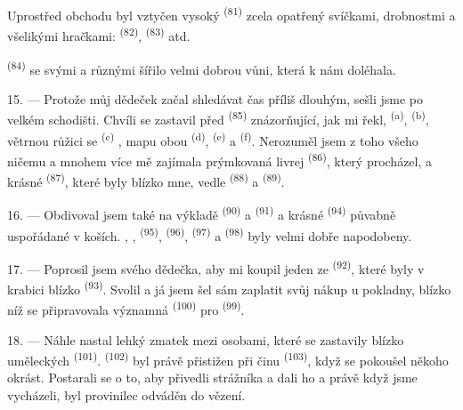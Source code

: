 Uprostřed obchodu byl vztyčen vysoký  \textsuperscript{(81)} zcela
opatřený svíčkami, drobnostmi a všelikými hračkami:
 \textsuperscript{(82)}, 
\textsuperscript{(83)} atd.

 \textsuperscript{(84)} se svými  a
různými  šířilo velmi dobrou vůni, která k nám doléhala.

\VUsaut{3.4mm}
\VUsaut{2.8mm}

15. --- Protože můj dědeček začal shledávat čas příliš dlouhým, sešli jsme po velkém
schodišti. Chvíli se zastavil před  \textsuperscript{(85)}
znázorňující, jak mi řekl,  \textsuperscript{(a)},
 \textsuperscript{(b)}, větrnou růžici se
 \textsuperscript{(c)}
, mapu obou 
\textsuperscript{(d)},  \textsuperscript{(e)} a 
\textsuperscript{(f)}. Nerozuměl jsem z toho všeho ničemu a mnohem více mě zajímala prýmkovaná
livrej  \textsuperscript{(86)}, který procházel, a krásné 
\textsuperscript{(87)}, které byly blízko mne, vedle
 \textsuperscript{(88)} a 
\textsuperscript{(89)}.

16. --- Obdivoval jsem také na výkladě  \textsuperscript{(90)} a
 \textsuperscript{(91)} a krásné 
\textsuperscript{(94)} půvabně uspořádané v koších. , ,
 \textsuperscript{(95)},  \textsuperscript{(96)},
 \textsuperscript{(97)} a 
\textsuperscript{(98)} byly velmi dobře napodobeny.

\VUsaut{4.4mm}
\VUsaut{2.8mm}

17. --- Poprosil jsem svého dědečka, aby mi koupil jeden ze 
\textsuperscript{(92)}, které byly v krabici blízko 
\textsuperscript{(93)}. Svolil a já jsem šel sám zaplatit svůj nákup u pokladny, blízko níž se
připravovala významná  \textsuperscript{(100)} pro
 \textsuperscript{(99)}.

18. --- Náhle nastal lehký zmatek mezi osobami, které se zastavily blízko uměleckých
 \textsuperscript{(101)}.  \textsuperscript{(102)} byl
právě přistižen při činu  \textsuperscript{(103)}, když se pokoušel někoho
okrást. Postarali se o to, aby přivedli strážníka a dali ho  a právě když
jsme vycházeli, byl provinilec odváděn do vězení.

